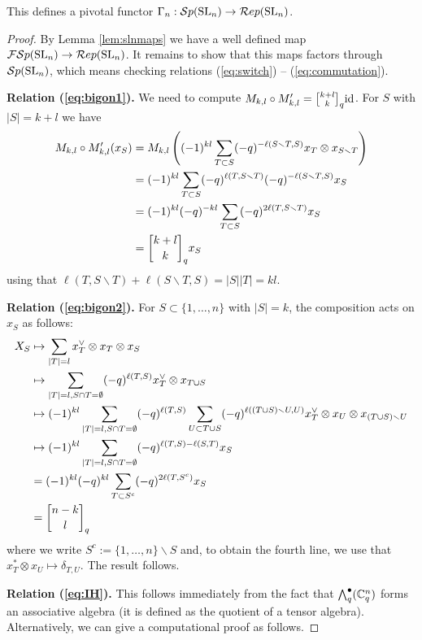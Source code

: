 \documentclass[11pt]{amsart}
\begin{document}
\begin{thm}\label{thm:gamma}
This defines a pivotal functor $\Gamma_n: {\mathcal{S}p}({\rm{SL}}_n) \rightarrow \mathcal{R}ep({\rm{SL}}_n)$.
\end{thm}
\begin{proof}
By Lemma \ref{lem:slnmaps} we have a well defined map ${\mathcal{FS}p}({\rm{SL}}_n) \rightarrow \mathcal{R}ep({\rm{SL}}_n)$. It remains to show that this maps factors through ${\mathcal{S}p}({\rm{SL}}_n)$, which means checking relations (\ref{eq:switch}) -- (\ref{eq:commutation}). 

{\bf Relation (\ref{eq:bigon1}).} We need to compute $M_{k,l} \circ M'_{k,l} = \qBinomial{k+l}{k} {\rm{id}}$. For $S $ with $|S|=k+l$ we have 
\begin{align*}
M_{k,l} \circ M'_{k,l}(x_S) 
&= M_{k,l} \left( (-1)^{kl} \sum_{T \subset S} (-q)^{- \ell( S \smallsetminus T, S)} x_T \otimes x_{S \smallsetminus T} \right) \\
&= (-1)^{kl}\sum_{T \subset S} (-q)^{\ell(T, S \smallsetminus T)} (-q)^{- \ell( S \smallsetminus T, S)} x_S \\
&= (-1)^{kl} (-q)^{-kl} \sum_{T \subset S} (-q)^{2\ell(T, S \smallsetminus T)} x_S \\
&= \qBinomial{k+l}{k} x_S
\end{align*}
using that $ \ell(T, S \smallsetminus T) + \ell( S \smallsetminus T, S) = |S||T| =kl$.


{\bf Relation (\ref{eq:bigon2}).} For $S \subset \{1,\dots,n\}$ with $|S|=k$, the composition acts on $x_S$ as follows:
\begin{align*}
X_S 
&\mapsto \sum_{|T|=l} x_T^\vee \otimes x_T \otimes x_S \\
&\mapsto \sum_{|T|=l, S \cap T = \emptyset} (-q)^{\ell(T,S)} x_T^\vee \otimes x_{T \cup S} \\
&\mapsto (-1)^{kl} \sum_{|T|=l, S \cap T = \emptyset} (-q)^{\ell(T,S)} \sum_{U \subset T \cup S} (-q)^{\ell((T \cup S) \smallsetminus U,U)} x_T^\vee \otimes x_U \otimes x_{(T \cup S) \smallsetminus U} \\
&\mapsto (-1)^{kl} \sum_{|T|=l, S \cap T = \emptyset} (-q)^{\ell(T,S) - \ell(S,T)} x_S \\
&= (-1)^{kl} (-q)^{kl} \sum_{T \subset S^c} (-q)^{2\ell(T, S^c)} x_S \\
&= \qBinomial{n-k}{l}
\end{align*}
where we write $S^c := \{1, \dots, n\} \smallsetminus S$ and, to obtain the fourth line, we use that $x_T^* \otimes x_U \mapsto \delta_{T,U}$. The result follows.

{\bf Relation (\ref{eq:IH}).}  This follows immediately from the fact that $ {\textstyle\bigwedge^{\bullet}_{q}}({\mathbb{C}}^n_q) $ forms an associative algebra (it is defined as the quotient of a tensor algebra).  Alternatively, we can give a computational proof as follows.


\end{proof}
\end{document}
